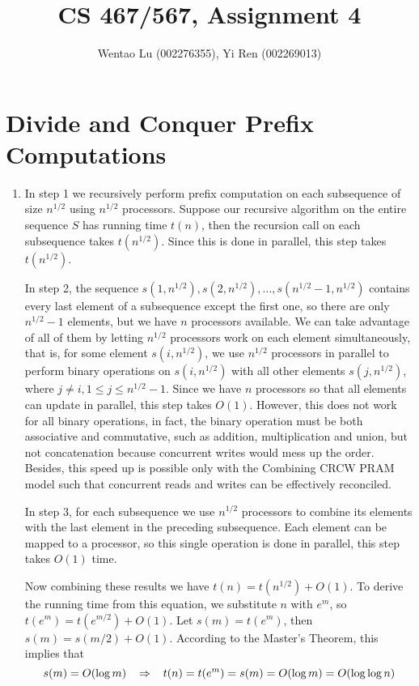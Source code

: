 \documentclass[11pt]{article}
\title{CS 467/567, Assignment 4}
\author{Wentao Lu (002276355), Yi Ren (002269013)}
\date{}
\begin{document}
  \maketitle


  \section{Divide and Conquer Prefix Computations}
  \begin{enumerate}
    \item In step 1 we recursively perform prefix computation on each subsequence of size $n^{1/2}$ using $n^{1/2}$ processors. Suppose our recursive algorithm on the entire sequence $S$ has running time $t(n)$, then the recursion call on each subsequence takes $t(n^{1/2})$. Since this is done in parallel, this step takes $t(n^{1/2})$.

    In step 2, the sequence $s(1,n^{1/2}), s(2,n^{1/2}), \dots, s(n^{1/2}-1,n^{1/2})$ contains every last element of a subsequence except the first one, so there are only $n^{1/2}-1$ elements, but we have $n$ processors available. We can take advantage of all of them by letting $n^{1/2}$ processors work on each element simultaneously, that is, for some element $s(i,n^{1/2})$, we use $n^{1/2}$ processors in parallel to perform binary operations on $s(i,n^{1/2})$ with all other elements $s(j,n^{1/2})$, where $j \neq i, 1 \leq j \leq n^{1/2}-1$. Since we have $n$ processors so that all elements can update in parallel, this step takes $O(1)$. However, this does not work for all binary operations, in fact, the binary operation must be both associative and commutative, such as addition, multiplication and union, but not concatenation because concurrent writes would mess up the order. Besides, this speed up is possible only with the Combining CRCW PRAM model such that concurrent reads and writes can be effectively reconciled.

    In step 3, for each subsequence we use $n^{1/2}$ processors to combine its elements with the last element in the preceding subsequence. Each element can be mapped to a processor, so this single operation is done in parallel, this step takes $O(1)$ time.

    Now combining these results we have $t(n) = t(n^{1/2}) + O(1)$. To derive the running time from this equation, we substitute $n$ with $e^m$, so $t(e^m) = t(e^{m/2}) + O(1)$. Let $s(m) = t(e^m)$, then $s(m) = s(m/2) + O(1)$. According to the Master's Theorem, this implies that
    \begin{equation*}
      s(m) = O(\log m) \hspace{3mm} \Rightarrow \hspace{3mm} t(n) = t(e^m) = s(m) = O(\log m) = O(\log \log n)
    \end{equation*}


\end{enumerate}
\end{document}
